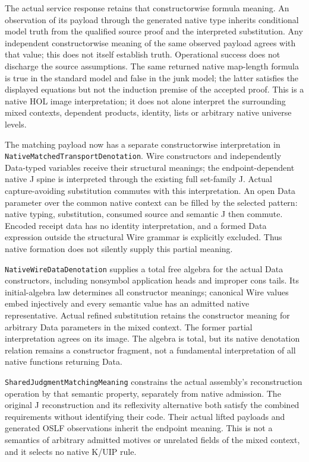 \documentclass[11pt]{article}
\theoremstyle{definition}
\theoremstyle{remark}
\begin{document}
The actual service response retains that constructorwise formula meaning.
An observation of its payload through the generated native type inherits
conditional model truth from the qualified source proof and the interpreted
substitution. Any independent constructorwise meaning of the same observed
payload agrees with that value; this does not itself establish truth.
Operational success does not discharge the source assumptions.
The same returned native map-length formula is true in the standard model
and false in the junk model; the latter satisfies the displayed equations but
not the induction premise of the accepted proof. This is a native HOL image
interpretation; it does not alone interpret the surrounding mixed contexts,
dependent products, identity, lists or arbitrary native universe levels.

The matching payload now has a separate constructorwise interpretation in
\nolinkurl{NativeMatchedTransportDenotation}. Wire constructors and independently
Data-typed variables receive their structural meanings; the endpoint-dependent
native J spine is interpreted through the existing full set-family J.
Actual capture-avoiding substitution commutes with this interpretation.
An open Data parameter over the common native context can be filled by the
selected pattern: native typing, substitution, consumed source and semantic J
then commute. Encoded receipt data has no identity interpretation, and a
formed Data expression outside the structural Wire grammar is explicitly
excluded. Thus native formation does not silently supply this partial meaning.

\nolinkurl{NativeWireDataDenotation} supplies a total free algebra for the
actual Data constructors, including nonsymbol application heads and improper
cons tails. Its initial-algebra law determines all constructor meanings;
canonical Wire values embed injectively and every semantic value has an
admitted native representative. Actual refined substitution retains the
constructor meaning for arbitrary Data parameters in the mixed context.
The former partial interpretation agrees on its image. The algebra is total,
but its native denotation relation remains a constructor fragment, not a
fundamental interpretation of all native functions returning Data.

\texttt{SharedJudgmentMatchingMeaning} constrains the actual assembly's
reconstruction operation by that semantic property, separately from native
admission. The original J reconstruction and its reflexivity alternative
both satisfy the combined requirements without identifying their code.
Their actual lifted payloads and generated OSLF observations inherit the
endpoint meaning. This is not a semantics of arbitrary admitted motives or
unrelated fields of the mixed context, and it selects no native K/UIP rule.
\end{document}
